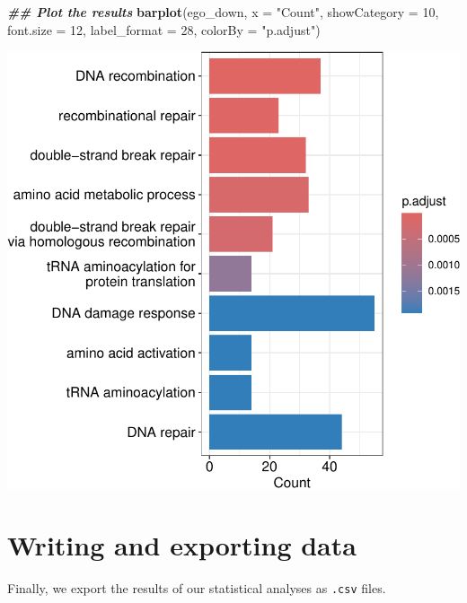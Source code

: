 \documentclass[9pt,a4paper,]{extarticle}
\newenvironment{Shaded}{\begin{snugshade}}{\end{snugshade}}
\newcommand{\AttributeTok}[1]{\textcolor[rgb]{0.13,0.29,0.53}{#1}}
\newcommand{\DecValTok}[1]{\textcolor[rgb]{0.00,0.00,0.81}{#1}}
\newcommand{\DocumentationTok}[1]{\textcolor[rgb]{0.56,0.35,0.01}{\textbf{\textit{#1}}}}
\newcommand{\FunctionTok}[1]{\textcolor[rgb]{0.13,0.29,0.53}{\textbf{#1}}}
\newcommand{\NormalTok}[1]{#1}
\newcommand{\StringTok}[1]{\textcolor[rgb]{0.31,0.60,0.02}{#1}}
\begin{document}
\begin{Shaded}
\begin{Highlighting}[]
\DocumentationTok{\#\# Plot the results}
\FunctionTok{barplot}\NormalTok{(ego\_down,}
        \AttributeTok{x =} \StringTok{"Count"}\NormalTok{,}
        \AttributeTok{showCategory =} \DecValTok{10}\NormalTok{,}
        \AttributeTok{font.size =} \DecValTok{12}\NormalTok{,}
        \AttributeTok{label\_format =} \DecValTok{28}\NormalTok{,}
        \AttributeTok{colorBy =} \StringTok{"p.adjust"}\NormalTok{)}
\end{Highlighting}
\end{Shaded}

\begin{center}\includegraphics[height=0.4\textheight]{workflow_expressions_files/figure-latex/GO_enrichment_plot-1} \end{center}

\section{Writing and exporting data}\label{writing-and-exporting-data}

Finally, we export the results of our statistical analyses as \texttt{.csv} files.
\end{document}

